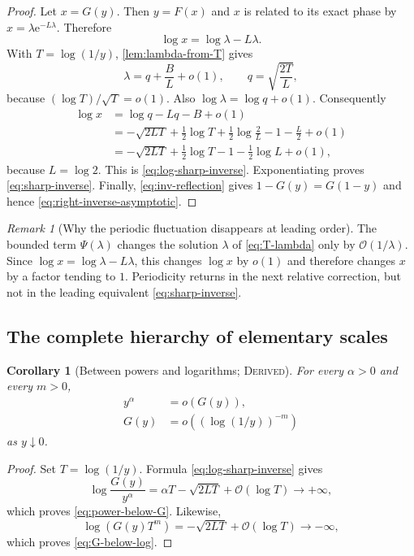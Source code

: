 \documentclass[11pt,oneside]{article}
\newtheorem{corollary}[theorem]{Corollary}
\theoremstyle{definition}
\theoremstyle{remark}
\newtheorem{remark}[theorem]{Remark}
\newcommand{\e}{\mathrm e}
\newcommand{\bigO}{\mathcal O}
\newcommand{\InvF}{G}
\newcommand{\Derived}{\textsc{Derived}}
\begin{document}
\begin{proof}
Let $x=\InvF(y)$.  Then $y=F(x)$ and $x$ is related to its exact phase by
$x=\lambda\e^{-L\lambda}$.  Therefore
\[
 \log x=\log\lambda-L\lambda.
\]
With $T=\log(1/y)$, \cref{lem:lambda-from-T} gives
\[
 \lambda=q+\frac BL+o(1),\qquad
 q=\sqrt{\frac{2T}{L}},
\]
because $(\log T)/\sqrt T=o(1)$.  Also $\log\lambda=\log q+o(1)$.
Consequently
\begin{align*}
 \log x
 &=\log q-Lq-B+o(1)\\
 &=-\sqrt{2LT}
   +\frac12\log T+\frac12\log\frac2L
   -1-\frac L2+o(1)\\
 &=-\sqrt{2LT}
   +\frac12\log T-1-\frac12\log L+o(1),
\end{align*}
because $L=\log2$.  This is \eqref{eq:log-sharp-inverse}.
Exponentiating proves \eqref{eq:sharp-inverse}.  Finally,
\eqref{eq:inv-reflection} gives
$1-\InvF(y)=\InvF(1-y)$ and hence
\eqref{eq:right-inverse-asymptotic}.
\end{proof}

\begin{remark}[Why the periodic fluctuation disappears at leading order]
The bounded term $\Psi(\lambda)$ changes the solution $\lambda$ of
\eqref{eq:T-lambda} only by $\bigO(1/\lambda)$.  Since
$\log x=\log\lambda-L\lambda$, this changes $\log x$ by $o(1)$ and
therefore changes $x$ by a factor tending to $1$.  Periodicity returns in
the next relative correction, but not in the leading equivalent
\eqref{eq:sharp-inverse}.
\end{remark}

\subsection{The complete hierarchy of elementary scales}

\begin{corollary}[Between powers and logarithms; \Derived]
\label{cor:inverse-scale-hierarchy}
For every $\alpha>0$ and every $m>0$,
\begin{align}
 y^\alpha&=o(\InvF(y)), \label{eq:power-below-G}\\
 \InvF(y)&=o\!\left((\log(1/y))^{-m}\right)
 \label{eq:G-below-log}
\end{align}
as $y\downarrow0$.
\end{corollary}

\begin{proof}
Set $T=\log(1/y)$.  Formula \eqref{eq:log-sharp-inverse} gives
\[
 \log\frac{\InvF(y)}{y^\alpha}
 =\alpha T-\sqrt{2LT}+\bigO(\log T)\longrightarrow+\infty,
\]
which proves \eqref{eq:power-below-G}.  Likewise,
\[
 \log\!\left(\InvF(y)T^m\right)
 =-\sqrt{2LT}+\bigO(\log T)\longrightarrow-\infty,
\]
which proves \eqref{eq:G-below-log}.
\end{proof}
\end{document}
